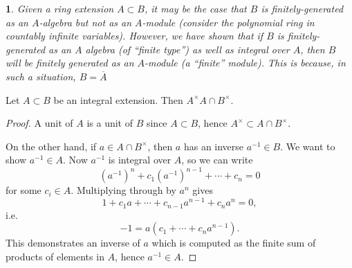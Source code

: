 \documentclass[12pt]{article}
\newtheorem{para}[theorem]{}
\begin{document}
\begin{para}
	Given a ring extension $A\subset B$, it may be the case that $B$ is finitely-generated as an $A$-algebra but not as an $A$-module (consider the polynomial ring in countably infinite variables). However, we have shown that if $B$ is finitely-generated as an $A$ algebra (of ``finite type'') as well as integral over $A$, then $B$ will be finitely generated as an $A$-module (a ``finite'' module). This is because, in such a situation, $B=\overline{A}$ 
\end{para}

\begin{proposition}
	Let $A\subset B$ be an integral extension. Then $A^\times A\cap B^\times$.
\end{proposition}
\begin{proof}
	A unit of $A$ is a unit of $B$ since $A\subset B$, hence $A^\times\subset A\cap B^\times$.

	On the other hand, if $a\in A\cap B^\times$, then $a$ has an inverse $a^{-1}\in B$. We want to show $a^{-1}\in A$. Now $a^{-1}$ is integral over $A$, so we can write 
	\begin{equation*}
		(a^{-1})^n + c_1(a^{-1})^{n-1} + \cdots + c_n=0
	\end{equation*}
	for some $c_i\in A$. Multiplying through by $a^n$ gives 
	\begin{equation*}
		1 + c_1a + \cdots + c_{n-1}a^{n-1} + c_na^n = 0,
	\end{equation*}
	i.e. 
	\begin{equation*}
		-1 = a(c_1 + \cdots + c_na^{n-1}).
	\end{equation*}
	This demonstrates an inverse of $a$ which is computed as the finite sum of products of elements in $A$, hence $a^{-1}\in A$.
\end{proof}
\end{document}
